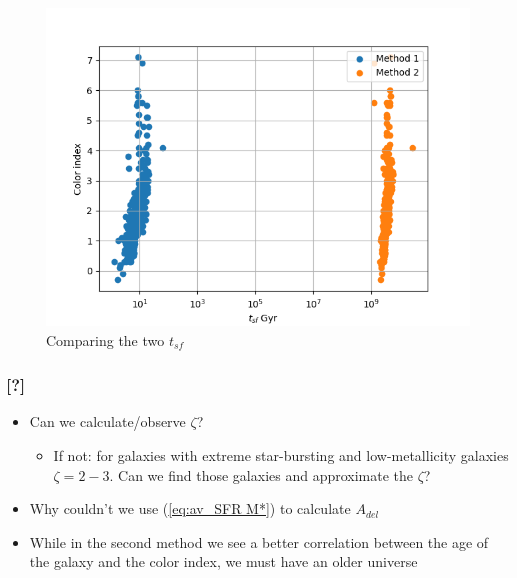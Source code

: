 \documentclass[a4paper,twocolumn]{article}
\begin{document}
\begin{figure}[!htpb]
\centering
\includegraphics[width=.9\linewidth]{./figs/tsf_tsf2.png}
\caption{\label{fig:Comparing the two $t_{sf}$}Comparing the two \(t_{sf}\)}
\end{figure}



\subsubsection{[?]}
\label{sec:org84e38fd}
\begin{itemize}
\item Can we calculate/observe \(\zeta\)?
\begin{itemize}
\item If not: for galaxies with extreme star-bursting and low-metallicity galaxies \(\zeta=2-3\). Can we find those galaxies and approximate the \(\zeta\)?
\end{itemize}
\item Why couldn't we use (\ref{eq:av_SFR M*}) to calculate \(A_{del}\)
\item While in the second method we see a better correlation between the age of the galaxy and the color index, we must have an older universe
\end{itemize}



\pagebreak
\printbibliography
\end{document}
